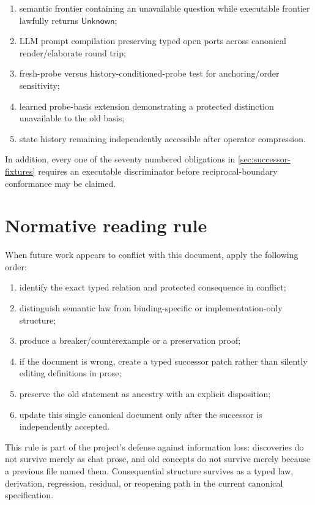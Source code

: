 \documentclass[11pt,oneside]{article}
\begin{document}
\begin{enumerate}
\item semantic frontier containing an unavailable question while executable frontier lawfully returns \(\mathsf{Unknown}\);
\item LLM prompt compilation preserving typed open ports across canonical render/elaborate round trip;
\item fresh-probe versus history-conditioned-probe test for anchoring/order sensitivity;
\item learned probe-basis extension demonstrating a protected distinction unavailable to the old basis;
\item state history remaining independently accessible after operator compression.
\end{enumerate}

In addition, every one of the seventy numbered obligations in \cref{sec:successor-fixtures} requires an executable discriminator before reciprocal-boundary conformance may be claimed.

\section{Normative reading rule}

When future work appears to conflict with this document, apply the following order:
\begin{enumerate}
\item identify the exact typed relation and protected consequence in conflict;
\item distinguish semantic law from binding-specific or implementation-only structure;
\item produce a breaker/counterexample or a preservation proof;
\item if the document is wrong, create a typed successor patch rather than silently editing definitions in prose;
\item preserve the old statement as ancestry with an explicit disposition;
\item update this single canonical document only after the successor is independently accepted.
\end{enumerate}

This rule is part of the project's defense against information loss: discoveries do not survive merely as chat prose, and old concepts do not survive merely because a previous file named them.  Consequential structure survives as a typed law, derivation, regression, residual, or reopening path in the current canonical specification.
\end{document}
